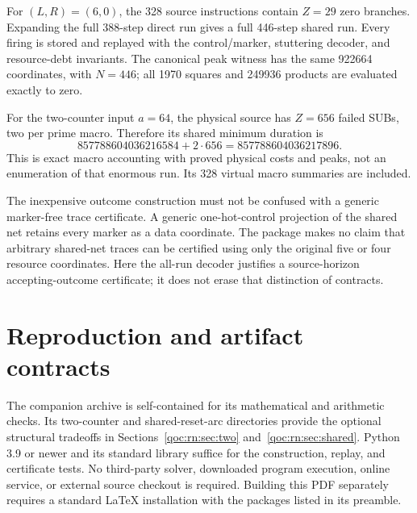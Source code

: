 \documentclass[11pt,letterpaper]{article}
\theoremstyle{definition}
\theoremstyle{remark}
\begin{document}
For $(L,R)=(6,0)$, the 328 source instructions contain $Z=29$ zero branches. Expanding the full 388-step direct run gives a full 446-step shared run. Every firing is stored and replayed with the control/marker, stuttering decoder, and resource-debt invariants. The canonical peak witness has the same 922664 coordinates, with $N=446$; all 1970 squares and 249936 products are evaluated exactly to zero.

For the two-counter input $a=64$, the physical source has $Z=656$ failed SUBs, two per prime macro. Therefore its shared minimum duration is
\[
 857788604036216584+2\cdot656
 =857788604036217896.
\]
This is exact macro accounting with proved physical costs and peaks, not an enumeration of that enormous run. Its 328 virtual macro summaries are included.

The inexpensive outcome construction must not be confused with a generic marker-free trace certificate. A generic one-hot-control projection of the shared net retains every marker as a data coordinate. The package makes no claim that arbitrary shared-net traces can be certified using only the original five or four resource coordinates. Here the all-run decoder justifies a source-horizon accepting-outcome certificate; it does not erase that distinction of contracts.



\section{Reproduction and artifact contracts}
\label{qoc:rn:sec:reproduce}
The companion archive is self-contained for its mathematical and arithmetic checks. Its two-counter and shared-reset-arc directories provide the optional structural tradeoffs in Sections~\ref{qoc:rn:sec:two} and~\ref{qoc:rn:sec:shared}. Python 3.9 or newer and its standard library suffice for the construction, replay, and certificate tests. No third-party solver, downloaded program execution, online service, or external source checkout is required. Building this PDF separately requires a standard LaTeX installation with the packages listed in its preamble.
\end{document}
